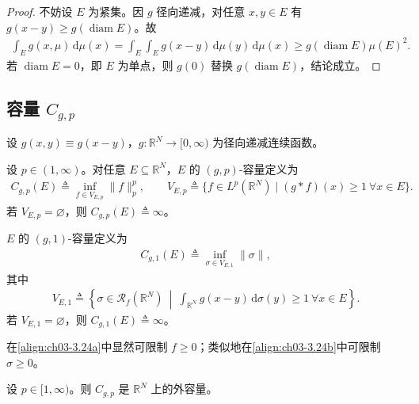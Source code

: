 \documentclass[../../main.tex]{subfiles}%
\begin{document}
\begin{proof}
不妨设 $E$ 为紧集。因 $g$ 径向递减，对任意 $x,y\in E$ 有 $g(x-y)\geqslant g(\operatorname{diam}E)$。故
\begin{align*}
\int_E g(x,\mu)\,\mathrm{d}\mu(x)
=\int_E\int_E g(x-y)\,\mathrm{d}\mu(y)\,\mathrm{d}\mu(x)
\geqslant g(\operatorname{diam}E)\mu(E)^2.
\end{align*}
若 $\operatorname{diam}E=0$，即 $E$ 为单点，则 $g(0)$ 替换 $g(\operatorname{diam}E)$，结论成立。
\end{proof}

\subsection{容量 $C_{g,p}$}\label{subsection:ch03-容量}

设 $g(x,y)\equiv g(x-y)$，$g:\mathbb{R}^N\to[0,\infty)$ 为径向递减连续函数。

\begin{definition}\label{definition:ch03-Cgp}
设 $p\in(1,\infty)$。对任意 $E\subseteq\mathbb{R}^N$，$E$ 的 $(g,p)$-容量定义为
\begin{align}
C_{g,p}(E)\triangleq \inf_{f\in V_{E,p}}\|f\|_p^p,\qquad
V_{E,p}\triangleq \{f\in L^p(\mathbb{R}^N)\mid (g*f)(x)\geqslant1\ \forall x\in E\}.\label{align:ch03-3.24a}
\end{align}
若 $V_{E,p}=\varnothing $，则 $C_{g,p}(E)\triangleq \infty$。

$E$ 的 $(g,1)$-容量定义为
\begin{align}
C_{g,1}(E)\triangleq \inf_{\sigma\in V_{E,1}}\|\sigma\|,\label{align:ch03-3.24b}
\end{align}
其中
\begin{align}
V_{E,1}\triangleq \left\{\sigma\in\mathscr{R}_f(\mathbb{R}^N)\ \middle|\ \int_{\mathbb{R}^N}g(x-y)\,\mathrm{d}\sigma(y)\geqslant1\ \forall x\in E\right\}.\label{align:ch03-3.24c}
\end{align}
若 $V_{E,1}=\varnothing $，则 $C_{g,1}(E)\triangleq \infty$。
\end{definition}

\begin{remark}\label{remark:ch03-非负可去}
在\eqref{align:ch03-3.24a}中显然可限制 $f\geqslant0$；类似地在\eqref{align:ch03-3.24b}中可限制 $\sigma\geqslant0$。
\end{remark}

\begin{theorem}\label{theorem:ch03-Cgp外容量}
设 $p\in[1,\infty)$。则 $C_{g,p}$ 是 $\mathbb{R}^N$ 上的外容量。
\end{theorem}
\end{document}
